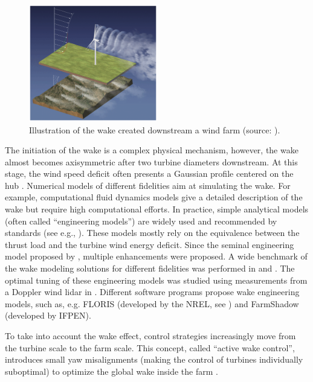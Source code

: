 \begin{figure}%
    \centering
    \includegraphics[width=0.5\textwidth]{./part1/figures/wake.png}
    \caption{Illustration of the wake created downstream a wind farm (source: \citealp{veers_2019_review}).} 
    \label{fig:wake_illustration}
\end{figure}

The initiation of the wake is a complex physical mechanism, however, the wake almost becomes axisymmetric after two turbine diameters downstream. 
At this stage, the wind speed deficit often presents a Gaussian profile centered on the hub \citep{burton_2021_wind_handbook}. 
Numerical models of different fidelities aim at simulating the wake. 
For example, computational fluid dynamics models give a detailed description of the wake but require high computational efforts. 
In practice, simple analytical models (often called ``engineering models'') are widely used and recommended by standards (see e.g., \citealp[Appendix E]{iec_2019}). 
These models mostly rely on the equivalence between the thrust load and the turbine wind energy deficit. 
Since the seminal engineering model proposed by \citet{jensen_1983_wake}, multiple enhancements were proposed. 
A wide benchmark of the wake modeling solutions for different fidelities was performed in \citet{doubrawa_2020_benchmark} and \citet{hiperwind_2023_wp3}. 
The optimal tuning of these engineering models was studied using measurements from a Doppler wind lidar in \citet{zhan_2020_optimal_wake}. 
Different software programs propose wake engineering models, such as, e.g. FLORIS (developed by the NREL, see \citealp{fleming_2020_FLORIS}) and FarmShadow (developed by IFPEN\footnotemark). 


To take into account the wake effect, control strategies increasingly move from the turbine scale to the farm scale. 
This concept, called ``active wake control'', introduces small yaw misalignments (making the control of turbines individually suboptimal) to optimize the global wake inside the farm \citep{rott_2018_active_control,simley_2020_active_control,meyers_2022_active_control}. 


